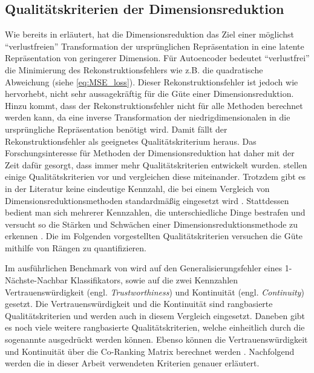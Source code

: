 \subsection{Qualitätskriterien der Dimensionsreduktion}
\label{ch:Vergleich:sec:Methodik:subsec:Qualitaetskriterien}
Wie bereits in  erläutert, hat die Dimensionsreduktion das Ziel einer möglichst \enquote{verlustfreien} Transformation der ursprünglichen Repräsentation in eine latente Repräsentation von geringerer Dimension. Für Autoencoder bedeutet \enquote{verlustfrei} die Minimierung des Rekonstruktionsfehlers wie z.B. die quadratische Abweichung (siehe \eqref{eq:MSE_loss}). Dieser Rekonstruktionsfehler ist jedoch wie \textcite[18]{vanderMaaten.2009} hervorhebt, nicht sehr aussagekräftig für die Güte einer Dimensionsreduktion. Hinzu kommt, dass der Rekonstruktionsfehler nicht für alle Methoden berechnet werden kann, da eine inverse Transformation der niedrigdimensionalen in die ursprüngliche Repräsentation benötigt wird. Damit fällt der Rekonstruktionsfehler als geeignetes Qualitätskriterium heraus. Das Forschungsinteresse für Methoden der Dimensionsreduktion hat daher mit der Zeit dafür gesorgt, dass immer mehr Qualitätskriterien entwickelt wurden. \textcite{Gracia.2014} stellen einige Qualitätskriterien vor und vergleichen diese miteinander. Trotzdem gibt es in der Literatur keine eindeutige Kennzahl, die bei einem Vergleich von Dimensionsreduktionsmethoden standardmäßig eingesetzt wird \parencite[vgl.][1 -- 2]{Lee.2009}. Stattdessen bedient man sich mehrerer Kennzahlen, die
unterschiedliche Dinge bestrafen und versucht so die Stärken und Schwächen einer
Dimensionsreduktionsmethode zu erkennen \parencite[486]{Venna.2001}. Die im Folgenden vorgestellten Qualitätskriterien versuchen die Güte
mithilfe von Rängen zu quantifizieren.

Im ausführlichen Benchmark von \textcite{vanderMaaten.2009} wird auf den Generalisierungsfehler
eines 1-Nächste-Nachbar Klassifikators, sowie auf die zwei Kennzahlen Vertrauenswürdigkeit (engl.
\textit{Trustworthiness}) und Kontinuität (engl. \textit{Continuity}) \parencites{Venna.2001}{Venna.2006} gesetzt. Die Vertrauenswürdigkeit und die Kontinuität sind
rangbasierte Qualitätskriterien und werden auch in diesem Vergleich eingesetzt. Daneben gibt es
noch viele weitere rangbasierte Qualitätskriterien, welche einheitlich durch die sogenannte
 \parencite[1432]{Lee.2009} ausgedrückt werden können. Ebenso können
die Vertrauenswürdigkeit und Kontinuität über die Co-Ranking Matrix berechnet werden \parencite[1433]{Lee.2009}. Nachfolgend werden die in dieser Arbeit verwendeten Kriterien genauer
erläutert.

